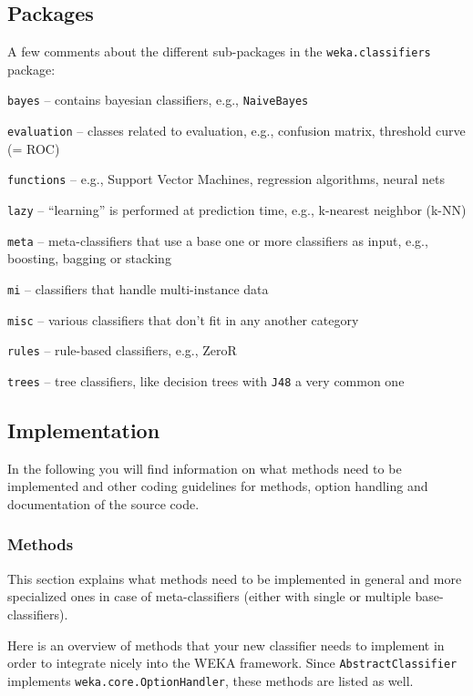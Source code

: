 \subsection{Packages}
A few comments about the different sub-packages in the \texttt{weka.classifiers}
package:

\begin{tight_itemize}
  \item \texttt{bayes} -- contains bayesian classifiers, e.g.,
\texttt{NaiveBayes}
  \item \texttt{evaluation} -- classes related to evaluation, e.g., confusion
matrix, threshold curve (= ROC)
  \item \texttt{functions} -- e.g., Support Vector Machines, regression
algorithms, neural nets
  \item \texttt{lazy} -- ``learning'' is performed at prediction time, e.g.,
k-nearest neighbor (k-NN)
  \item \texttt{meta} -- meta-classifiers that use a base one or more
classifiers as input, e.g., boosting, bagging or stacking
  \item \texttt{mi} -- classifiers that handle multi-instance data
  \item \texttt{misc} -- various classifiers that don't fit in any another
category
  \item \texttt{rules} -- rule-based classifiers, e.g., ZeroR
  \item \texttt{trees} -- tree classifiers, like decision trees with
\texttt{J48} a very common one
\end{tight_itemize}

\newpage

\subsection{Implementation}
In the following you will find information on what methods need to be
implemented and other coding guidelines for methods, option handling and
documentation of the source code.

\subsubsection{Methods}
\label{classifier_methods}
This section explains what methods need to be implemented in general and more
specialized ones in case of meta-classifiers (either with single or multiple
base-classifiers).

Here is an overview of methods that your new classifier needs to implement in
order to integrate nicely into the WEKA framework. Since
\texttt{AbstractClassifier} implements
\texttt{weka.core.OptionHandler}, these methods are listed as well.

